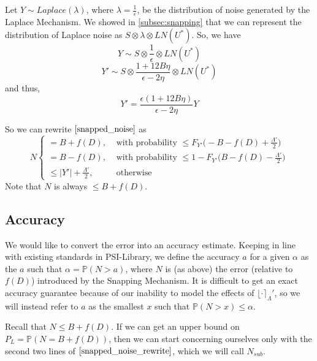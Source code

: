 \documentclass[11pt]{scrartcl} %
\begin{document}
Let $Y \sim Laplace(\lambda)$, where $\lambda = \frac{1}{\epsilon}$, be the distribution of noise generated by the Laplace Mechanism.
We showed in \autoref{subsec:snapping} that we can represent the distribution of Laplace noise as $S \otimes \lambda \otimes LN(U^*)$. So, we have
\[ Y \sim S \otimes \frac{1}{\epsilon} \otimes LN(U^*) \]
\[ Y' \sim S \otimes \frac{1 + 12B\eta}{\epsilon - 2\eta} \otimes LN(U^*) \]
and thus,
\[ Y' = \frac{\epsilon(1 + 12B\eta)}{\epsilon - 2\eta}Y \]

So we can rewrite $\eqref{snapped_noise}$ as
\begin{equation}
	\label{snapped_noise_rewrite}
	N
		\begin{cases}
			= B + f(D), &\text{ with probability } \leq F_{Y'} \big( -B - f(D) + \frac{\Lambda'}{2} \big)  \\
			= B - f(D), &\text{ with probability } \leq 1 - F_{Y'} \big( B - f(D) - \frac{\Lambda'}{2} \big)  \\
			\leq \vert Y' \vert + \frac{\Lambda'}{2}, &\text{ otherwise }
		\end{cases}
\end{equation}
Note that $N$ is always $\leq B + f(D)$.

\subsection{Accuracy}
We would like to convert the error into an accuracy estimate. Keeping in line with existing standards in PSI-Library, we define the accuracy $a$ for a given $\alpha$ as the $a$ such that $\alpha = \mathbb{P}(N > a)$, where $N$ is (as above) the error (relative to $f(D)$) introduced by the Snapping Mechanism. It is difficult to get an exact accuracy guarantee because of our inability to model the effects of $\lfloor \cdot \rceil_\Lambda'$, so we will instead refer to $a$ as the smallest $x$ such that $\mathbb{P}(N > x) \leq \alpha$. \newline

Recall that $N \leq B + f(D)$. If we can get an upper bound on $P_{L} = \mathbb{P}(N = B + f(D))$, then we can start concerning ourselves only with the second two lines of $\eqref{snapped_noise_rewrite}$, which we will call $N_{sub}$. \newline
\end{document}
